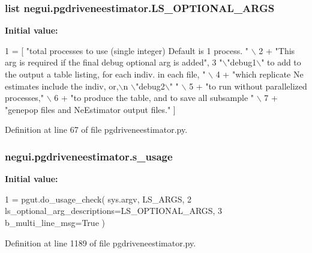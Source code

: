 \subsubsection[{\texorpdfstring{L\+S\+\_\+\+O\+P\+T\+I\+O\+N\+A\+L\+\_\+\+A\+R\+GS}{LS_OPTIONAL_ARGS}}]{\setlength{\rightskip}{0pt plus 5cm}list negui.\+pgdriveneestimator.\+L\+S\+\_\+\+O\+P\+T\+I\+O\+N\+A\+L\+\_\+\+A\+R\+GS}\hypertarget{namespacenegui_1_1pgdriveneestimator_ab14b858e573928fa3916ed18030e5ecc}{}\label{namespacenegui_1_1pgdriveneestimator_ab14b858e573928fa3916ed18030e5ecc}
{\bfseries Initial value\+:}
\begin{DoxyCode}
1 = [ \textcolor{stringliteral}{"total processes to use (single integer) Default is 1 process.  "} \(\backslash\)
2         + \textcolor{stringliteral}{"This arg is required if the final debug optional arg is added"},
3         \textcolor{stringliteral}{"\(\backslash\)"debug1\(\backslash\)" to add to the output a table listing, for each indiv. in each file, "} \(\backslash\)
4                 + \textcolor{stringliteral}{"which replicate Ne estimates include the indiv, or,\(\backslash\)n \(\backslash\)"debug2\(\backslash\)" "} \(\backslash\)
5                 + \textcolor{stringliteral}{"to run without parallelized processes,"} \(\backslash\)
6                 + \textcolor{stringliteral}{"to produce the table, and to save all subsample "} \(\backslash\)
7                 + \textcolor{stringliteral}{"genepop files and NeEstimator output files."} ]
\end{DoxyCode}


Definition at line 67 of file pgdriveneestimator.\+py.

\subsubsection[{\texorpdfstring{s\+\_\+usage}{s_usage}}]{\setlength{\rightskip}{0pt plus 5cm}negui.\+pgdriveneestimator.\+s\+\_\+usage}\hypertarget{namespacenegui_1_1pgdriveneestimator_a147253c79bbe39eef5bc01233bda5ab7}{}\label{namespacenegui_1_1pgdriveneestimator_a147253c79bbe39eef5bc01233bda5ab7}
{\bfseries Initial value\+:}
\begin{DoxyCode}
1 = pgut.do\_usage\_check( sys.argv, LS\_ARGS, 
2             ls\_optional\_arg\_descriptions=LS\_OPTIONAL\_ARGS,
3             b\_multi\_line\_msg=\textcolor{keyword}{True} )
\end{DoxyCode}


Definition at line 1189 of file pgdriveneestimator.\+py.

